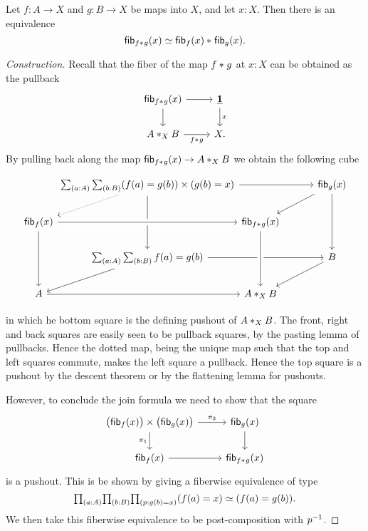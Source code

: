 \begin{thm}\label{defn:join-fiber}
Let $f:A\to X$ and $g:B\to X$ be maps into $X$, and let $x:X$. Then there is
an equivalence
\begin{equation*}
\eqv{\fib{\join{f}{g}}{x}}{\join{\fib{f}{x}}{\fib{g}{x}}}.
\end{equation*}
\end{thm}

\begin{proof}[Construction]
Recall that the fiber of the map $\join{f}{g}$ at $x:X$ can be obtained as
the pullback
\begin{equation*}
\begin{tikzcd}
\fib{\join{f}{g}}{x} \arrow[r] \arrow[d] & \unit \arrow[d,"x"] \\
\join[X]{A}{B} \arrow[r,swap,"\join{f}{g}"] & X.
\end{tikzcd}
\end{equation*}
By pulling back along the map $\fib{\join{f}{g}}{x}\to \join[X]{A}{B}$ we
obtain the following cube
\begin{small}
\begin{equation*}
\begin{tikzcd}[column sep=3em]
& \makebox[5em]{$\sm{a:A}{b:B}(f(a)=g(b))\times (g(b)=x)$} \arrow[rr,start anchor={[xshift=6.3em]}] \arrow[dl,densely dotted] \arrow[dd] 
  & & \fib{g}{x} \arrow[dd] \arrow[dl] \\
\fib{f}{x} \arrow[rr,crossing over] \arrow[dd] & & \fib{\join{f}{g}}{x} \\
  & \sm{a:A}{b:B}f(a)=g(b) \arrow[dl] \arrow[rr] & & B \arrow[dl] \\
A \arrow[rr] & & \join[X]{A}{B} \arrow[from=uu,crossing over]
\end{tikzcd}
\end{equation*}
\end{small}%
in which he bottom square is the defining pushout of $\join[X]{A}{B}$. 
The front, right and back squares are easily seen to be pullback squares, by the pasting lemma of pullbacks. Hence the dotted map, being the unique map such that the top and left squares commute, makes the left square a pullback. Hence the top square is a pushout by the descent theorem or by the flattening lemma for pushouts.

However, to conclude the join formula we need to show that the square
\begin{equation*}
\begin{tikzcd}
\big(\fib{f}{x}\big)\times\big(\fib{g}{x}\big) \arrow[r,"\pi_2"] \arrow[d,swap,"\pi_1"] & \fib{g}{x} \arrow[d] \\
\fib{f}{x} \arrow[r] & \fib{\join{f}{g}}{x}
\end{tikzcd}
\end{equation*}
is a pushout. This is be shown by giving a fiberwise equivalence of type
\begin{equation*}
\prd{a:A}{b:B}{p:g(b)=x} \eqv{(f(a)=x)}{(f(a)=g(b))}.
\end{equation*}
We then take this fiberwise equivalence to be post-composition with $\opp{p}$. 
\end{proof}


